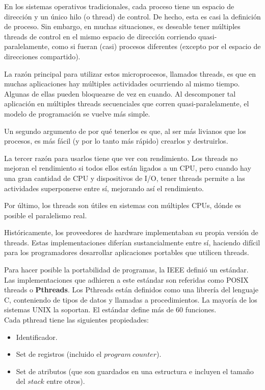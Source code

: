 En los sistemas operativos tradicionales, cada proceso tiene un espacio de dirección y un único hilo (o thread) de control. De hecho, esta es casi
la definición de proceso. Sin embargo, en muchas situaciones, es deseable tener múltiples threads de control en el mismo espacio de dirección corriendo 
quasi-paralelamente, como si fueran (casi) procesos diferentes (excepto por el espacio de direcciones compartido).

La razón principal para utilizar estos microprocesos, llamados threads\cite{Tanen}, es que en muchas aplicaciones hay múltiples actividades ocurriendo al mismo tiempo.
Algunas de ellas pueden bloquearse de vez en cuando. Al descomponer tal aplicación en múltiples threads secuenciales que corren quasi-paralelamente, el 
modelo de programación se vuelve más simple.

Un segundo argumento de por qué tenerlos es que, al ser más livianos que los procesos, es más fácil (y por lo tanto más rápido) crearlos y destruirlos.

La tercer razón para usarlos tiene que ver con rendimiento. Los threads no mejoran el rendimiento si todos ellos están ligados a un CPU, pero cuando
hay una gran cantidad de CPU y dispositivos de I/O, tener threads permite a las actividades superponerse entre sí, mejorando así el rendimiento.

Por último, los threads son útiles en sistemas con múltiples CPUs, dónde es posible el paralelismo real.

Históricamente, los proveedores de hardware implementaban su propia versión de threads. Estas implementaciones diferían sustancialmente entre sí, haciendo difícil
para los programadores desarrollar aplicaciones portables que utilicen threads.\cite{Pthreads}

Para hacer posible la portabilidad de programas, la IEEE definió un estándar. Las implementaciones que adhieren a este estándar son referidas como
POSIX threads o \textbf{Pthreads}. Los Pthreads están definidos como una librería del lenguaje C, conteniendo de tipos de datos y llamadas a procedimientos.
La mayoría de los sistemas UNIX la soportan. El estándar define más de 60 funciones.\\
Cada pthread tiene las siguientes propiedades:
\begin{itemize}
 \item Identificador.
 \item Set de registros (incluido el $program\ counter$).
 \item Set de atributos (que son guardados en una estructura e incluyen el tamaño del $stack$ entre otros).\\
\end{itemize}

